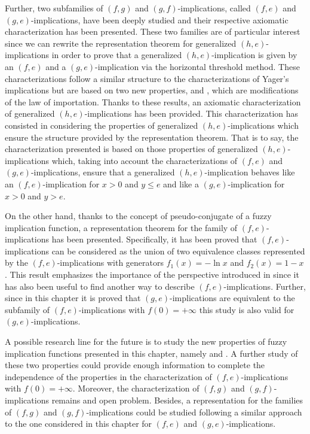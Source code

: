 Further, two subfamilies of $(f,g)$ and $(g,f)$-implications, called $(f,e)$ and $(g,e)$-implications, have been deeply studied and their respective axiomatic characterization has been presented. These two families are of particular interest since we can rewrite the representation theorem for generalized $(h,e)$-implications in order to prove that a generalized $(h,e)$-implication is given by an $(f,e)$ and a $(g,e)$-implication via the horizontal threshold method. These characterizations follow a similar structure to the characterizations of Yager's implications but are based on two new properties, \LIex and \LIey, which are modifications of the law of importation. Thanks to these results, an axiomatic characterization of generalized $(h,e)$-implications has been provided. This characterization has consisted in considering the properties of generalized $(h,e)$-implications which ensure the structure provided by the representation theorem. That is to say, the characterization presented is based on those properties of generalized $(h,e)$-implications which, taking into account the characterizations of $(f,e)$ and $(g,e)$-implications, ensure that a generalized $(h,e)$-implication behaves like an $(f,e)$-implication for $x>0$ and $y \leq e$ and like a $(g,e)$-implication for $x>0$ and $y>e$.

On the other hand, thanks to the concept of pseudo-conjugate of a fuzzy implication function, a representation theorem for the family of $(f,e)$-implications has been presented. Specifically, it has been proved that $(f,e)$-implications can be considered as the union of two equivalence classes represented by the $(f,e)$-implications with generators $f_1(x)=-\ln x$ and $f_2(x)= 1-x$. This result emphasizes the importance of the perspective introduced in \cite{Vemuri2014} since it has also been useful to find another way to describe $(f,e)$-implications. Further, since in this chapter it is proved that $(g,e)$-implications are equivalent to the subfamily of $(f,e)$-implications with $f(0)=+\infty$ this study is also valid for $(g,e)$-implications.

A possible research line for the future is to study the new properties of fuzzy implication functions presented in this chapter, namely \LIex and \LIey. A further study of these two properties could provide enough information to complete the independence of the properties in the characterization of $(f,e)$-implications with $f(0)=+\infty$. Moreover, the characterization of $(f,g)$ and $(g,f)$-implications remains and open problem. Besides, a representation for the families of $(f,g)$ and $(g,f)$-implications could be studied following a similar approach to the one considered in this chapter for $(f,e)$ and $(g,e)$-implications.